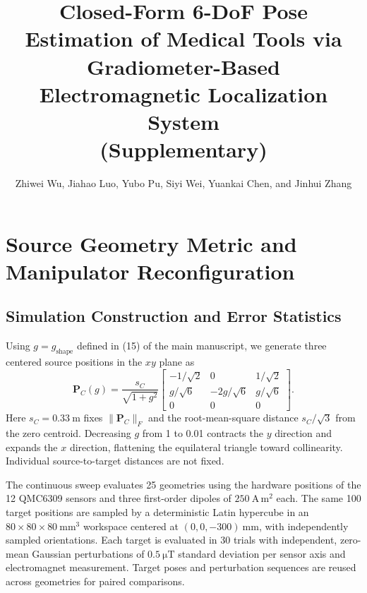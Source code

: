 \documentclass[letterpaper,10pt,journal,twocolumn]{IEEEtran}
\title{\LARGE\bfseries Closed-Form 6-DoF Pose Estimation of Medical Tools via Gradiometer-Based Electromagnetic Localization System\\
\normalfont\LARGE (Supplementary)}
\author{\normalsize Zhiwei Wu, Jiahao Luo, Yubo Pu, Siyi Wei, Yuankai Chen, and Jinhui Zhang}
\begin{document}
\IEEEaftertitletext{\vspace{-2\baselineskip}}
\maketitle
\raggedbottom
\setlength{\abovedisplayskip}{5pt plus 1pt minus 1pt}
\setlength{\belowdisplayskip}{5pt plus 1pt minus 1pt}
\setlength{\abovedisplayshortskip}{2pt plus 1pt}
\setlength{\belowdisplayshortskip}{4pt plus 1pt minus 1pt}
\setlength{\textfloatsep}{8pt plus 2pt minus 2pt}
\setlength{\dbltextfloatsep}{8pt plus 2pt minus 2pt}

\section{Source Geometry Metric and Manipulator Reconfiguration}
\label{sec:supp_source_geometry}

\subsection{Simulation Construction and Error Statistics}

Using $g=g_{\mathrm{shape}}$ defined in (15) of the main manuscript, we
generate three centered source positions in the $xy$ plane as
\begin{equation*}
    \bm P_C(g)
    =
    \frac{s_C}{\sqrt{1+g^2}}
    \begin{bmatrix}
        -1/\sqrt{2} & 0 & 1/\sqrt{2} \\
        g/\sqrt{6} & -2g/\sqrt{6} & g/\sqrt{6} \\
        0 & 0 & 0
    \end{bmatrix}.
\end{equation*}
Here $s_C=\SI{0.33}{\meter}$ fixes $\|\bm P_C\|_F$ and the root-mean-square
distance $s_C/\sqrt{3}$ from the zero centroid. Decreasing $g$ from 1 to 0.01
contracts the $y$ direction and expands the $x$ direction, flattening the
equilateral triangle toward collinearity. Individual source-to-target
distances are not fixed.

The continuous sweep evaluates 25 geometries using the hardware positions of
the 12 QMC6309 sensors and three first-order dipoles of
$250~\mathrm{A\,m^2}$ each. The same 100 target positions are sampled by a
deterministic Latin hypercube in an $80\times80\times80~\si{\milli\meter\cubed}$
workspace centered at $(0,0,-300)~\si{\milli\meter}$, with independently
sampled orientations. Each target is evaluated in 30 trials with independent,
zero-mean Gaussian perturbations of $\SI{0.5}{\micro\tesla}$ standard deviation
per sensor axis and electromagnet measurement. Target poses and perturbation
sequences are reused across geometries for paired comparisons.
\end{document}
